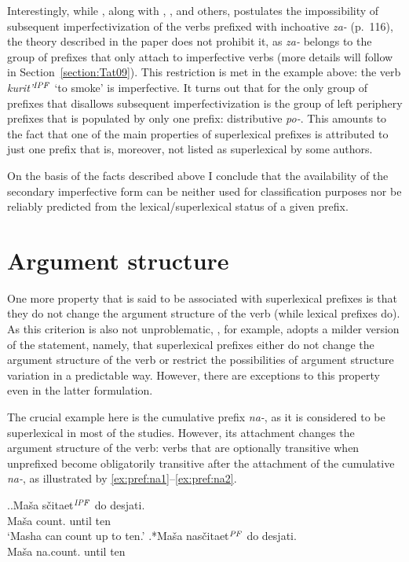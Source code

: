 Interestingly, while \citet{Tatevosov:09}, along with \citet{Svenonius:04b}, \citet{Ramchand:04}, and others, postulates the impossibility of subsequent imperfectivization of the verbs prefixed with inchoative \textit{za-} (p.~116), the theory described in the paper does not prohibit it, as \textit{za-} belongs to the group of prefixes that only attach to imperfective verbs (more details will follow in Section~\ref{section:Tat09}). This restriction is met in the example above: the verb \textit{kurit'}$^{\mathit{IPF}}$ `to smoke' is imperfective. It turns out that for \citet{Tatevosov:09} the only group of prefixes that disallows subsequent imperfectivization is the group of left periphery prefixes that is populated by only one prefix: distributive \textit{po-}. This amounts to the fact that one of the main properties of superlexical prefixes is attributed to just one prefix that is, moreover, not listed as superlexical by some authors.

On the basis of the facts described above I conclude that the availability of the secondary imperfective form can be neither used for classification purposes nor be reliably predicted from the lexical/superlexical status of a given prefix.

\section{Argument structure}\label{section:new:argstructure}
One more property that is said to be associated with superlexical prefixes is that they do not change the argument structure of the verb (while lexical prefixes do). As this criterion is also not unproblematic, \citet[116]{Tatevosov:09}, for example, adopts a milder version of the statement, namely, that superlexical prefixes either do not change the argument structure of the verb or restrict the possibilities of argument structure variation in a predictable way. However, there are exceptions to this property even in the latter formulation. 

The crucial example here is the cumulative prefix \textit{na-}, as it is considered to be superlexical in most of the studies. However, its attachment changes the argument structure of the verb: verbs that are optionally transitive when unprefixed become obligatorily transitive after the attachment of the cumulative \textit{na-}, as illustrated by \ref{ex:pref:na1}--\ref{ex:pref:na2}.

\ex.\label{ex:pref:na1}\ag.\label{ex:pref:na1a}Ma\v{s}a s\v{c}itaet$^{\mathit{IPF}}$ do desjati.\\
Ma\v{s}a count. until ten\\
\vspace{0.5em}
`Masha can count up to ten.'
\bg.*Ma\v{s}a nas\v{c}itaet$^{\mathit{PF}}$ do desjati.\label{ex:pref:na1b}\\
Ma\v{s}a na.count. until ten\\

